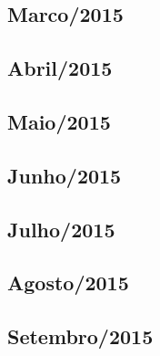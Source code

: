 \documentclass[12pt,a4paper]{article}
\begin{document}
\subsection{Marco/2015}
  
 
\subsection{Abril/2015}
  
  
\subsection{Maio/2015} 
  
  
  
   
\subsection{Junho/2015}
   
   
   
%   
%   

\subsection{Julho/2015}
    
     
    
    
     
    
    
\subsection{Agosto/2015}
   
   
   
%   
% 

\subsection{Setembro/2015}
  
   
%   
%   
% 


\end{document}
